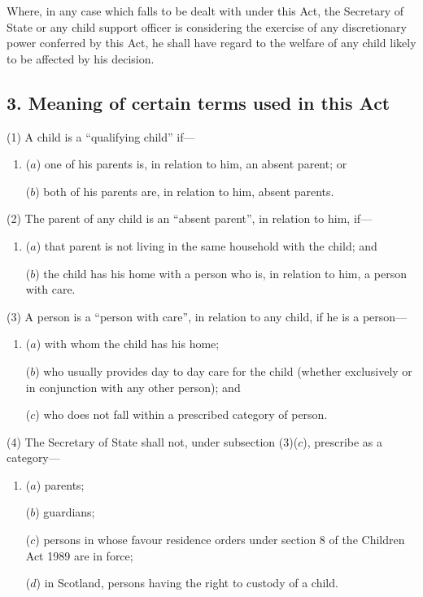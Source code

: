 \documentclass[12pt,a4paper]{article}
\begin{document}
Where, in any case which falls to be dealt with under this Act, the Secretary of State or any child support officer is considering the exercise of any discretionary power conferred by this Act, he shall have regard to the welfare of any child likely to be affected by his decision.

\subsection{3. Meaning of certain terms used in this Act}

(1) A child is a “qualifying child” if—
\begin{enumerate}\item[]
($a$) one of his parents is, in relation to him, an absent parent; or

($b$) both of his parents are, in relation to him, absent parents.
\end{enumerate}

(2) The parent of any child is an “absent parent”, in relation to him, if—
\begin{enumerate}\item[]
($a$) that parent is not living in the same household with the child; and

($b$) the child has his home with a person who is, in relation to him, a person with care.
\end{enumerate}

(3) A person is a “person with care”, in relation to any child, if he is a person—
\begin{enumerate}\item[]
($a$) with whom the child has his home;

($b$) who usually provides day to day care for the child (whether exclusively or in conjunction with any other person); and

($c$) who does not fall within a prescribed category of person.
\end{enumerate}

(4) The Secretary of State shall not, under subsection (3)($c$), prescribe as a category—
\begin{enumerate}\item[]
($a$) parents;

($b$) guardians;

($c$) persons in whose favour residence orders under section 8 of the Children Act 1989 are in force;

($d$) in Scotland, persons having the right to custody of a child.
\end{enumerate}
\end{document}
